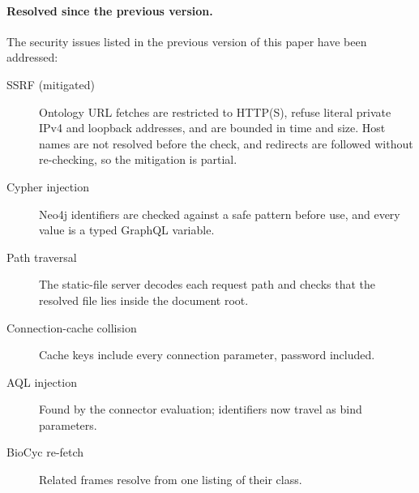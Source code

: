\documentclass[sigconf,nonacm]{acmart}
\begin{document}
\paragraph{Resolved since the previous version.}
The security issues listed in the previous version of this paper have
been addressed:
\begin{description}
  \item[SSRF (mitigated)] Ontology URL fetches are restricted to HTTP(S),
    refuse literal private IPv4 and loopback addresses, and are bounded
    in time and size.  Host names are not resolved before the check, and
    redirects are followed without re-checking, so the mitigation is
    partial.
  \item[Cypher injection] Neo4j identifiers are checked against a safe
    pattern before use, and every value is a typed GraphQL variable.
  \item[Path traversal] The static-file server decodes each request path
    and checks that the resolved file lies inside the document root.
  \item[Connection-cache collision] Cache keys include every connection
    parameter, password included.
  \item[AQL injection] Found by the connector evaluation; identifiers
    now travel as bind parameters.
  \item[BioCyc re-fetch] Related frames resolve from one listing of
    their class.
\end{description}
\end{document}
